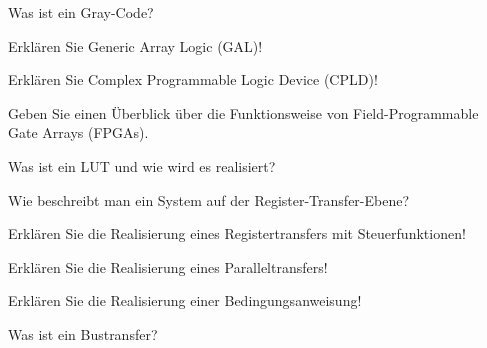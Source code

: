 \documentclass
[
  draft    = true,
  fontsize = 11pt,
  parskip  = half-,
  BCOR     = 0pt,
  DIV      = 11,
  ngerman,
  dvipsnames
]
{scrartcl}
\begin{document}
\begin{mytemize}
\begin{mytemize}
        \end{mytemize}
  \item Was ist ein Gray-Code?
  \item Erklären Sie Generic Array Logic (GAL)!
  \item Erklären Sie Complex Programmable Logic Device (CPLD)!
  \item Geben Sie einen Überblick über die Funktionsweise von Field-Programmable Gate Arrays (FPGAs).
        \begin{mytemize}
          \item Was ist ein LUT und wie wird es realisiert?
        \end{mytemize}
  \item Wie beschreibt man ein System auf der Register-Transfer-Ebene?
  \item Erklären Sie die Realisierung eines Registertransfers mit Steuerfunktionen!
  \item Erklären Sie die Realisierung eines Paralleltransfers!
  \item Erklären Sie die Realisierung einer Bedingungsanweisung!
  \item Was ist ein Bustransfer?
\end{mytemize}

\end{document}
